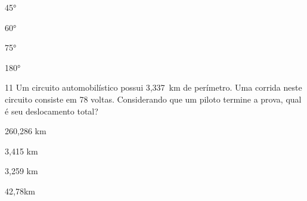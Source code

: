 \begin{escolha}
\item 45°
\item 60°
\item 75°
\item 180°
\end{escolha}












\pagebreak

\num{11} Um circuito automobilístico possui 3,337~km de perímetro. Uma
corrida neste circuito consiste em 78 voltas. Considerando que um piloto
termine a prova, qual é seu deslocamento total?

\begin{multicols}{2}
\begin{escolha}
\item 260,286 km
\item 3,415 km
\item 3,259 km
\item 42,78km
\end{escolha}
\end{multicols}



